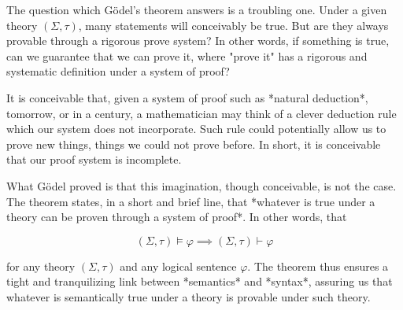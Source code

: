 \documentclass[a4paper, 12pt]{article}
\begin{document}
The question which Gödel's theorem answers is a troubling one. Under a given theory
$(\Sigma, \tau)$, many statements will conceivably be true. But are they always
provable through a rigorous prove system? In other words, if something is true,
can we guarantee that we can prove it, where "prove it" has a rigorous and
systematic definition under a system of proof? 

It is conceivable that, given a system of proof such as *natural deduction*,
tomorrow, or in a century, a mathematician may think of a clever deduction rule
which our system does not incorporate. Such rule could potentially allow us to
prove new things, things we could not prove before. In short, it is conceivable
that our proof system is incomplete.

What Gödel proved is that this imagination, though conceivable, is not the case.
The theorem states, in a short and brief line, that *whatever is true under a theory
can be proven through a system of proof*. In other words, that

$$
(\Sigma, \tau) \vDash \varphi \implies (\Sigma, \tau) \vdash \varphi
$$

for any theory $(\Sigma, \tau)$ and any logical sentence $\varphi$. The theorem 
thus ensures a tight and tranquilizing link between *semantics* and *syntax*,
assuring us that whatever is semantically true under a theory is provable under 
such theory.
\end{document}
